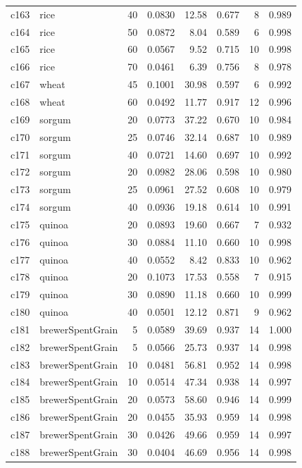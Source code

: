 \begin{longtable}{llrrrrrr}
c163 & rice & 40 & 0.0830 & 12.58 & 0.677 & 8 & 0.989 \\
c164 & rice & 50 & 0.0872 & 8.04 & 0.589 & 6 & 0.998 \\
c165 & rice & 60 & 0.0567 & 9.52 & 0.715 & 10 & 0.998 \\
c166 & rice & 70 & 0.0461 & 6.39 & 0.756 & 8 & 0.978 \\
c167 & wheat & 45 & 0.1001 & 30.98 & 0.597 & 6 & 0.992 \\
c168 & wheat & 60 & 0.0492 & 11.77 & 0.917 & 12 & 0.996 \\
c169 & sorgum & 20 & 0.0773 & 37.22 & 0.670 & 10 & 0.984 \\
c170 & sorgum & 25 & 0.0746 & 32.14 & 0.687 & 10 & 0.989 \\
c171 & sorgum & 40 & 0.0721 & 14.60 & 0.697 & 10 & 0.992 \\
c172 & sorgum & 20 & 0.0982 & 28.06 & 0.598 & 10 & 0.980 \\
c173 & sorgum & 25 & 0.0961 & 27.52 & 0.608 & 10 & 0.979 \\
c174 & sorgum & 40 & 0.0936 & 19.18 & 0.614 & 10 & 0.991 \\
c175 & quinoa & 20 & 0.0893 & 19.60 & 0.667 & 7 & 0.932 \\
c176 & quinoa & 30 & 0.0884 & 11.10 & 0.660 & 10 & 0.998 \\
c177 & quinoa & 40 & 0.0552 & 8.42 & 0.833 & 10 & 0.962 \\
c178 & quinoa & 20 & 0.1073 & 17.53 & 0.558 & 7 & 0.915 \\
c179 & quinoa & 30 & 0.0890 & 11.18 & 0.660 & 10 & 0.999 \\
c180 & quinoa & 40 & 0.0501 & 12.12 & 0.871 & 9 & 0.962 \\
c181 & brewerSpentGrain & 5 & 0.0589 & 39.69 & 0.937 & 14 & 1.000 \\
c182 & brewerSpentGrain & 5 & 0.0566 & 25.73 & 0.937 & 14 & 0.998 \\
c183 & brewerSpentGrain & 10 & 0.0481 & 56.81 & 0.952 & 14 & 0.998 \\
c184 & brewerSpentGrain & 10 & 0.0514 & 47.34 & 0.938 & 14 & 0.997 \\
c185 & brewerSpentGrain & 20 & 0.0573 & 58.60 & 0.946 & 14 & 0.999 \\
c186 & brewerSpentGrain & 20 & 0.0455 & 35.93 & 0.959 & 14 & 0.998 \\
c187 & brewerSpentGrain & 30 & 0.0426 & 49.66 & 0.959 & 14 & 0.997 \\
c188 & brewerSpentGrain & 30 & 0.0404 & 46.69 & 0.956 & 14 & 0.998 \\

\end{longtable}
